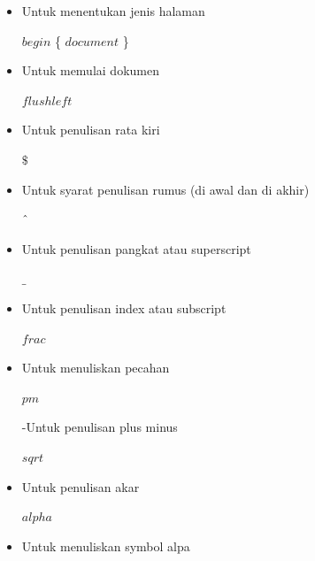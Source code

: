 \begin{itemize}
\vspace{\baselineskip}
	\item Untuk menentukan jenis halaman\par


$begin$ \{ $document$ \} \par

	\item Untuk memulai dokumen\par

\vspace{\baselineskip}
$flushleft$\par

	\item Untuk penulisan rata kiri\par

\vspace{\baselineskip}
$\$$\par

	\item Untuk syarat penulisan rumus (di awal dan di akhir)\par

\vspace{\baselineskip}
$ \string^ $\par

	\item Untuk penulisan pangkat atau superscript\par

\vspace{\baselineskip}
$ \_ $\par

	\item Untuk penulisan index atau subscript\par

\vspace{\baselineskip}
$frac$\par

	\item Untuk menuliskan pecahan\par

\vspace{\baselineskip}
$pm$\par

-Untuk penulisan plus minus\par

\vspace{\baselineskip}
$sqrt$\par

	\item Untuk penulisan akar\par

\vspace{\baselineskip}
$alpha$\par

\vspace{\baselineskip}
	\item Untuk menuliskan symbol alpa
	
\end{itemize}\par

